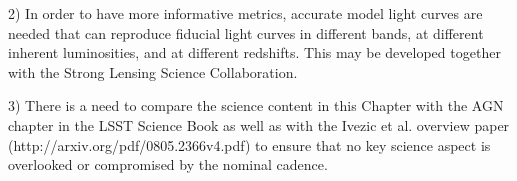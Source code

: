 
2) In order to have more informative metrics, accurate model light
curves are needed that can reproduce fiducial light curves in different
bands, at different inherent luminosities, and at different redshifts.
This may be developed together with the Strong Lensing Science Collaboration.



3) There is a need to compare the science content in this Chapter
with the AGN chapter in the LSST Science Book as well as with the
Ivezic et al. overview paper (http://arxiv.org/pdf/0805.2366v4.pdf)
to ensure that no key science aspect is overlooked or compromised
by the nominal cadence.






